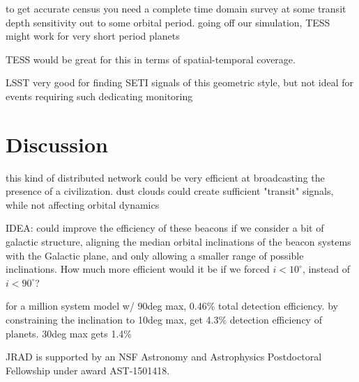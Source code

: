 \documentclass[modern]{aastex61}
\begin{document}
to get accurate census you need a complete time domain survey at some transit depth sensitivity out to some orbital period. going off our simulation, TESS might work for very short period planets

TESS would be great for this in terms of spatial-temporal coverage. 

LSST very good for finding SETI signals of this geometric style, but not ideal for events requiring such dedicating monitoring


\section{Discussion}
this kind of distributed network could be very efficient at broadcasting the presence of a civilization. dust clouds could create sufficient "transit" signals, while not affecting orbital dynamics


IDEA:
could improve the efficiency of these beacons if we consider a bit of galactic structure, aligning the median orbital inclinations of the beacon systems with the Galactic plane, and only allowing a smaller range of possible inclinations. How much more efficient would it be if we forced $i<10^\circ$, instead of $i<90^\circ$?

for a million system model w/ 90deg max, 0.46\% total detection efficiency. 
by constraining the inclination to 10deg max, get 4.3\% detection efficiency of planets. 30deg max gets 1.4\%

\acknowledgments
JRAD is supported by an NSF Astronomy and Astrophysics Postdoctoral Fellowship under award AST-1501418.


\end{document}
